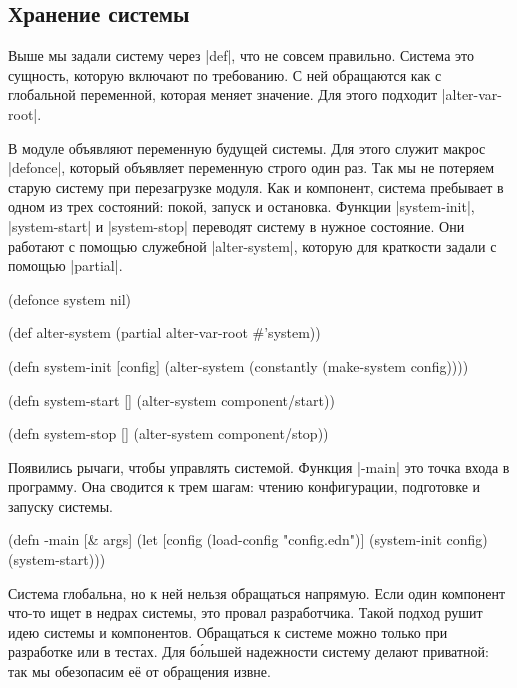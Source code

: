 \subsection{Хранение системы}

Выше мы задали систему через \spverb|def|, что не совсем правильно. Система это
сущность, которую включают по требованию. С ней обращаются как с глобальной
переменной, которая меняет значение. Для этого подходит \spverb|alter-var-root|.

В модуле объявляют переменную будущей системы. Для этого служит макрос
\spverb|defonce|, который объявляет переменную строго один раз. Так мы не
потеряем старую систему при перезагрузке модуля. Как и компонент, система
пребывает в одном из трех состояний: покой, запуск и остановка. Функции
\spverb|system-init|, \spverb|system-start| и \spverb|system-stop| переводят
систему в нужное состояние. Они работают с помощью служебной
\spverb|alter-system|, которую для краткости задали с помощью \spverb|partial|.

\begin{english}
  \begin{clojure}
(defonce system nil)

(def alter-system (partial alter-var-root #'system))

(defn system-init [config]
  (alter-system (constantly (make-system config))))

(defn system-start []
  (alter-system component/start))

(defn system-stop []
  (alter-system component/stop))
  \end{clojure}
\end{english}

Появились рычаги, чтобы управлять системой. Функция \spverb|-main| это точка
входа в программу. Она сводится к трем шагам: чтению конфигурации, подготовке и
запуску системы.

\begin{english}
  \begin{clojure}
(defn -main [& args]
  (let [config (load-config "config.edn")]
    (system-init config)
    (system-start)))
  \end{clojure}
\end{english}

Система глобальна, но к ней нельзя обращаться напрямую. Если один компонент
что-то ищет в недрах системы, это провал разработчика. Такой подход рушит идею
системы и компонентов. Обращаться к системе можно только при разработке или в
тестах. Для б\'{о}льшей надежности систему делают приватной: так мы обезопасим
е\"{е} от обращения извне.

